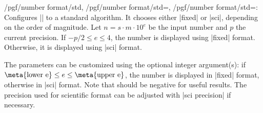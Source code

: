 \documentclass[a4paper]{ltxdoc}
\begin{document}
\begin{keylist}{/pgf/number format/std,%
    /pgf/number format/std=,
    /pgf/number format/std=:%
}
    Configures |\pgfmathprintnumber| to a standard algorithm. It chooses either
    |fixed| or |sci|, depending on the order of magnitude. Let $n=s \cdot m
    \cdot 10^e$ be the input number and $p$ the current precision. If $-p/2 \le
    e \le 4$, the number is displayed using |fixed| format. Otherwise, it is
    displayed using |sci| format.

\begin{codeexample}[]
\hspace{1em}
\hspace{1em}
\hspace{1em}
\hspace{1em}
\end{codeexample}
    The parameters can be customized using the optional integer argument(s): if
    $\text{\meta{lower e}} \le e \le \text{\meta{upper e}}$, the number is
    displayed in |fixed| format, otherwise in |sci| format. Note that
     should be negative for useful results. The precision used
    for scientific format can be adjusted with |sci precision| if necessary.

\end{keylist}
\end{document}
